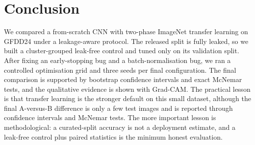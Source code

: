 \documentclass[11pt,a4paper]{article}
\begin{document}
\section{Conclusion}
We compared a from-scratch CNN with two-phase ImageNet transfer learning on
GFDD24 under a leakage-aware protocol. The released split is fully leaked, so
we built a cluster-grouped leak-free control and tuned only on its validation
split. After fixing an early-stopping bug and a batch-normalisation bug, we ran
a controlled optimisation grid and three seeds per final configuration. The
final comparison is supported by bootstrap confidence intervals and exact
McNemar tests, and the qualitative evidence is shown with Grad-CAM. The
practical lesson is that transfer learning is the stronger default on this
small dataset, although the final A-versus-B difference is only a few test
images and is reported through confidence intervals and McNemar tests. The more
important lesson is methodological: a curated-split accuracy is not a
deployment estimate, and a leak-free control plus paired statistics is the
minimum honest evaluation.

\footnotesize
\raggedright


\end{document}

